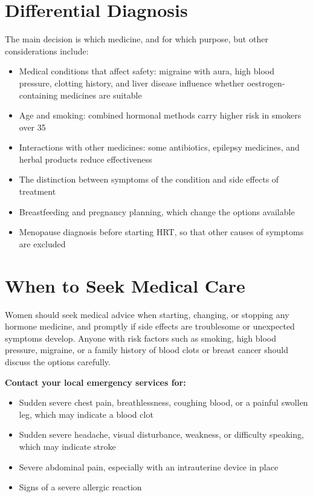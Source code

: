 \section*{Differential Diagnosis}
The main decision is which medicine, and for which purpose, but other considerations include:
\begin{itemize}
    \item Medical conditions that affect safety: migraine with aura, high blood pressure, clotting history, and liver disease influence whether oestrogen-containing medicines are suitable
    \item Age and smoking: combined hormonal methods carry higher risk in smokers over 35
    \item Interactions with other medicines: some antibiotics, epilepsy medicines, and herbal products reduce effectiveness
    \item The distinction between symptoms of the condition and side effects of treatment
    \item Breastfeeding and pregnancy planning, which change the options available
    \item Menopause diagnosis before starting HRT, so that other causes of symptoms are excluded
\end{itemize}

\section*{When to Seek Medical Care}
Women should seek medical advice when starting, changing, or stopping any hormone medicine, and promptly if side effects are troublesome or unexpected symptoms develop. Anyone with risk factors such as smoking, high blood pressure, migraine, or a family history of blood clots or breast cancer should discuss the options carefully.

\textbf{Contact your local emergency services for:}
\begin{itemize}
    \item Sudden severe chest pain, breathlessness, coughing blood, or a painful swollen leg, which may indicate a blood clot
    \item Sudden severe headache, visual disturbance, weakness, or difficulty speaking, which may indicate stroke
    \item Severe abdominal pain, especially with an intrauterine device in place
    \item Signs of a severe allergic reaction
\end{itemize}

